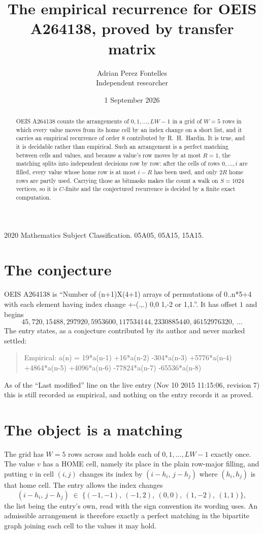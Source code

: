 \documentclass[11pt,a4paper]{article}
\title{The empirical recurrence for OEIS A264138, proved by transfer matrix}
\author{Adrian Perez Fontelles\\ \small Independent researcher}
\date{1 September 2026}
\theoremstyle{plain}
\theoremstyle{definition}
\begin{document}
\maketitle

\begin{abstract}
OEIS A264138 counts the arrangements of $0,1,\dots,LW-1$ in a grid of $W=5$ rows in which
every value moves from its home cell by an index change on a short list, and it carries an
empirical recurrence of order $8$ contributed by R.~H.~Hardin. It is true, and it is
decidable rather than empirical. Such an arrangement is a perfect matching between cells and
values, and because a value's row moves by at most $R=1$, the matching splits into
independent decisions row by row: after the cells of rows $0,\dots,i$ are filled,
every value whose home row is at most $i-R$ has been used, and only $2R$ home rows are
partly used. Carrying those as bitmasks makes the count a walk on $S=1024$ vertices, so it is
$C$-finite and the conjectured recurrence is decided by a finite exact computation.
\end{abstract}

\noindent\small 2020 Mathematics Subject Classification. 05A05, 05A15, 15A15.\normalsize

\section{The conjecture}

OEIS A264138 is ``Number of (n+1)X(4+1) arrays of permutations of 0..n*5+4 with each element having index change +-(.,.) 0,0 1,-2 or 1,1.''. It has offset $1$ and begins
\[
45, 720, 15488, 297920, 5953600, 117534144, 2330885440, 46152976320,\ \dots
\]
The entry states, as a conjecture contributed by its author and never marked settled:
\begin{quote}
Empirical: a(n) = 19*a(n-1) +16*a(n-2) -304*a(n-3) +5776*a(n-4) +4864*a(n-5) +4096*a(n-6) -77824*a(n-7) -65536*a(n-8)
\end{quote}
As of the ``Last modified'' line on the live entry (Nov 10 2015 11:15:06, revision 7) this is still
recorded as empirical, and nothing on the entry records it as proved.

\section{The object is a matching}

The grid has $W=5$ rows across and holds each of $0,1,\dots,LW-1$ exactly once. The value
$v$ has a HOME cell, namely its place in the plain row-major filling, and putting $v$ in cell
$(i,j)$ changes its index by $(i-h_i,\,j-h_j)$ where $(h_i,h_j)$ is that home cell. The entry
allows the index changes
\[
(i-h_i,\,j-h_j)\;\in\;\{(-1,-1),\ (-1,2),\ (0,0),\ (1,-2),\ (1,1)\},
\]
the list being the entry's own, read with the sign convention its wording uses. An admissible
arrangement is therefore exactly a perfect matching in the bipartite graph joining each cell to
the values it may hold.
\end{document}
